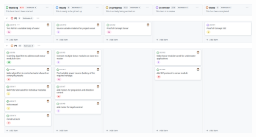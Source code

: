 \documentclass[11pt,a4paper,titlepage]{report}
\begin{document}
	\begin{center}
		\label{picture:priority}
		\includegraphics[scale=0.2]{assets/priority.png}
	\end{center}
	
\end{document}
